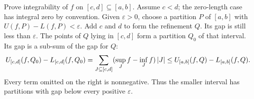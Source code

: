 \goal Prove integrability of $f$ on $[c,d]\subseteq[a,b]$.
Assume $c<d$; the zero-length case has integral zero by convention.
Given $\varepsilon>0$, choose a partition $P$ of $[a,b]$ with
$U(f,P)-L(f,P)<\varepsilon$. Add $c$ and $d$ to form the refinement
$Q$. Its gap is still less than $\varepsilon$.
The points of $Q$ lying in $[c,d]$ form a partition $Q_0$ of that interval.
Its gap is a sub-sum of the gap for $Q$:
\[
 U_{[c,d]}(f,Q_0)-L_{[c,d]}(f,Q_0)
 =\sum_{J\subseteq[c,d]}(\sup_J f-\inf_J f)\left|J\right|
 \le U_{[a,b]}(f,Q)-L_{[a,b]}(f,Q).
\]
Every term omitted on the right is nonnegative. Thus the smaller
interval has partitions with gap below every positive $\varepsilon$.
